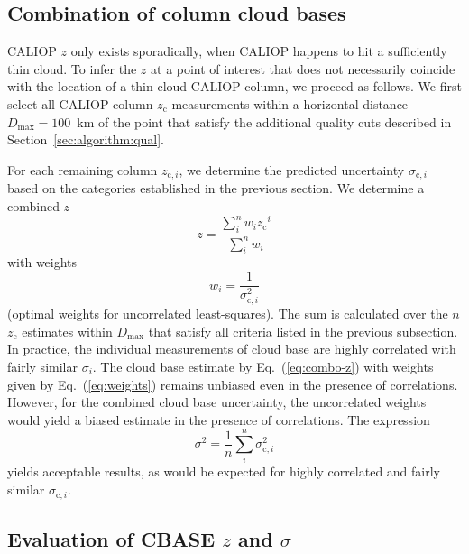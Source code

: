 \documentclass[essd,manuscript]{copernicus}
\begin{document}
\subsection{Combination of column cloud bases}
\label{sec:algorithm:combination}
CALIOP \ensuremath{z}{} only exists sporadically, 
when CALIOP happens to hit a sufficiently thin cloud.  To infer the \ensuremath{z}{} at a
point of interest that does not necessarily coincide with the location of
a thin-cloud CALIOP column, we proceed as follows.  We first select all CALIOP
column \ensuremath{z_\text{c}}{} measurements within a horizontal distance $D_\text{max} = 100$~\unit{km} of
the point that satisfy the additional quality cuts described in
Section~\ref{sec:algorithm:qual}. 

For each remaining column $\ensuremath{z}{}_{\text{c},i}$, we determine the predicted
uncertainty $\sigma_{\text{c},i}$ based on the categories established in the previous
section.  We determine a combined \ensuremath{z}{}
\begin{equation}
  \label{eq:combo-z}
  \ensuremath{z} = \frac{\sum\limits_i^n w_i \ensuremath{z_\text{c}}^i}{\sum\limits_i^n w_i}
\end{equation}
with weights
\begin{equation}
  \label{eq:weights}
  w_i = \frac 1 {\sigma_{\text{c},i}^2}
\end{equation}
(optimal weights for uncorrelated least-squares).  The sum is calculated over
the $n$ \ensuremath{z_\text{c}}{} estimates within $D_\text{max}$ that satisfy all criteria listed
in the previous subsection.  In practice, the individual
measurements of cloud base are highly correlated with fairly similar
$\sigma_i$.  The cloud base estimate by Eq.~(\ref{eq:combo-z}) with weights
given by Eq.~(\ref{eq:weights}) remains unbiased even in the presence of
correlations.  However, for the combined cloud base uncertainty,
the uncorrelated weights would yield a biased estimate in the presence of
correlations.  The expression
\begin{equation}
  \label{eq:combo-sigma}
  \sigma^2 = \frac 1 n \sum\limits_i^n \sigma_{\text{c},i}^2
\end{equation}
yields acceptable results, as would be expected for highly correlated and fairly
similar $\sigma_{\text{c},i}$.  

\subsection{Evaluation of CBASE \ensuremath{z}{} and $\sigma$}
\label{sec:algorithm:eval}
\end{document}
